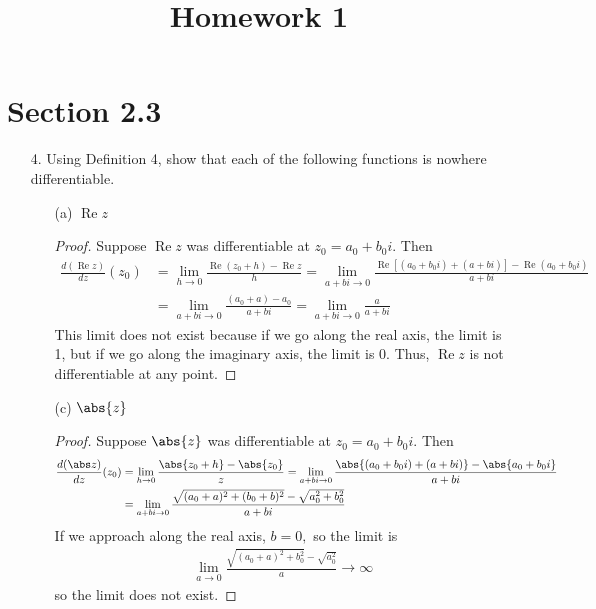 \documentclass{article}
\DeclareMathOperator{\re}{Re}
\begin{document}
\title{Homework 1}
\maketitle
\thispagestyle{fancy}

\section*{Section 2.3}

\begin{itemize}
	\item[4.] Using Definition 4, show that each of the following functions is nowhere differentiable.
		\begin{itemize}
			\item[(a)] $\re z$
				\begin{proof}
					Suppose $\re z$ was differentiable at $z_0=a_0+b_0i.$ Then
					\begin{align*}
						\frac{d(\re z)}{dz} (z_0) &= \lim_{h\to 0}\frac{\re(z_0+h)-\re z}{h} = \lim_{a+bi\to 0}\frac{\re\left[ (a_0+b_0i)+(a+bi) \right] - \re(a_0+b_0i)}{a+bi} \\
						&= \lim_{a+bi\to 0}\frac{(a_0+a)-a_0}{a+bi} = \lim_{a+bi\to 0} \frac{a}{a+bi}
					\end{align*}
					This limit does not exist because if we go along the real axis, the limit is 1, but if we go along the imaginary axis, the limit is 0. Thus, $\re z$ is not differentiable at any point.
				\end{proof}

			\item[(c)] $\abs{z}$
				\begin{proof}
					Suppose $\abs{z}$ was differentiable at $z_0=a_0+b_0i.$ Then
					\begin{align*}
						\frac{d(\abs z)}{dz} (z_0) &= \lim_{h\to 0}\frac{\abs{z_0+h}-\abs{z_0}}{z} = \lim_{a+bi\to 0}\frac{\abs{(a_0+b_0i)+(a+bi)} - \abs{a_0+b_0i}}{a+bi} \\
						&= \lim_{a+bi\to 0} \frac{\sqrt{(a_0+a)^2+(b_0+b)^2}-\sqrt{a_0^2+b_0^2}}{a+bi}
					\end{align*}
					If we approach along the real axis, $b=0,$ so the limit is
					\begin{align*}
						\lim_{a\to 0} \frac{\sqrt{(a_0+a)^2+b_0^2}-\sqrt{a_0^2}}{a} \to\infty
					\end{align*}
					so the limit does not exist.
				\end{proof}
				
		\end{itemize}


\end{itemize}
\end{document}
